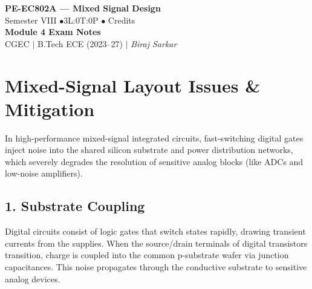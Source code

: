 \documentclass[12pt,a4paper]{article}
\begin{document}

\begin{center}
  {\LARGE\bfseries\color{myred} PE-EC802A --- Mixed Signal Design}\\[5pt]
  {\normalsize\color{mydark} Semester VIII \quad$\bullet$\quad 3L:0T:0P \quad$\bullet$ Credits}\\[3pt]
  {\normalsize\color{myteal}\textbf{Module 4 Exam Notes}}\\[3pt]
  {\small\color{mydark} CGEC \;$|$\; B.Tech ECE (2023--27) \;$|$\; \textit{Biraj Sarkar}}
\end{center}
\vspace{2pt}
\noindent{\color{myred}\rule{\linewidth}{1.5pt}}
\vspace{2pt}

\hypersetup{linkcolor=mydark}
\tableofcontents
\hypersetup{linkcolor=myteal}
\newpage

\section{Mixed-Signal Layout Issues \& Mitigation}

In high-performance mixed-signal integrated circuits, fast-switching digital gates inject noise into the shared silicon substrate and power distribution networks, which severely degrades the resolution of sensitive analog blocks (like ADCs and low-noise amplifiers).

\subsection{1. Substrate Coupling}
Digital circuits consist of logic gates that switch states rapidly, drawing transient currents from the supplies. When the source/drain terminals of digital transistors transition, charge is coupled into the common p-substrate wafer via junction capacitances. This noise propagates through the conductive substrate to sensitive analog devices.
\end{document}
